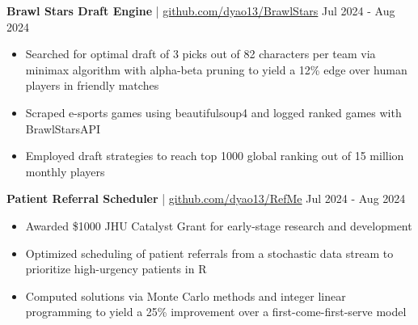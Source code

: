 \documentclass[11pt]{article}       %
\begin{document}
\textbf{Brawl Stars Draft Engine} | \href{https://github.com/dyao13/BrawlStars}{github.com/dyao13/BrawlStars} \hfill Jul 2024 - Aug 2024 \vspace{-9pt} \\
\begin{itemize}
  \item Searched for optimal draft of 3 picks out of 82 characters per team via minimax algorithm with alpha-beta pruning to yield a 12\% edge over human players in friendly matches
  \item Scraped e-sports games using beautifulsoup4 and logged ranked games with BrawlStarsAPI
  \item Employed draft strategies to reach top 1000 global ranking out of 15 million monthly players
\end{itemize}

\textbf{Patient Referral Scheduler} | \href{https://github.com/dyao13/RefMe}{github.com/dyao13/RefMe} \hfill Jul 2024 - Aug 2024 \vspace{-9pt} \\
\begin{itemize}
  \item Awarded \$1000 JHU Catalyst Grant for early-stage research and development
  \item Optimized scheduling of patient referrals from a stochastic data stream to prioritize high-urgency patients in R
  \item Computed solutions via Monte Carlo methods and integer linear programming to yield a 25\% improvement over a first-come-first-serve model
\end{itemize}

\vspace{-9pt}
\end{document}

